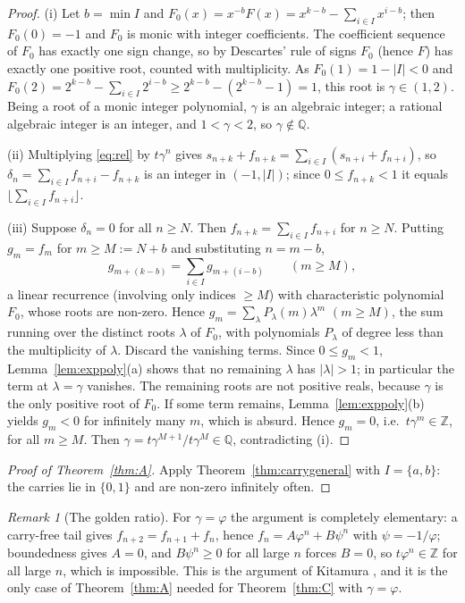 \documentclass[11pt]{amsart}
\theoremstyle{definition}
\theoremstyle{remark}
\newtheorem{remark}[lemma]{Remark}
\newcommand{\Z}{\mathbb{Z}}
\newcommand{\Q}{\mathbb{Q}}
\newcommand{\fl}[1]{\lfloor #1\rfloor}
\begin{document}
\begin{proof}
(i) Let $b=\min I$ and $F_0(x)=x^{-b}F(x)=x^{k-b}-\sum_{i\in I}x^{i-b}$; then $F_0(0)=-1$
and $F_0$ is monic with integer coefficients. The coefficient sequence of $F_0$ has exactly
one sign change, so by Descartes' rule of signs $F_0$ (hence $F$) has exactly one positive
root, counted with multiplicity. As $F_0(1)=1-|I|<0$ and
$F_0(2)=2^{k-b}-\sum_{i\in I}2^{i-b}\ge2^{k-b}-(2^{k-b}-1)=1$, this root is $\gamma\in(1,2)$.
Being a root of a monic integer polynomial, $\gamma$ is an algebraic integer; a rational
algebraic integer is an integer, and $1<\gamma<2$, so $\gamma\notin\Q$.

(ii) Multiplying \eqref{eq:rel} by $t\gamma^n$ gives
$s_{n+k}+f_{n+k}=\sum_{i\in I}(s_{n+i}+f_{n+i})$, so
$\delta_n=\sum_{i\in I}f_{n+i}-f_{n+k}$ is an integer in $(-1,|I|)$; since
$0\le f_{n+k}<1$ it equals $\fl{\sum_{i\in I}f_{n+i}}$.

(iii) Suppose $\delta_n=0$ for all $n\ge N$. Then $f_{n+k}=\sum_{i\in I}f_{n+i}$ for
$n\ge N$. Putting $g_m=f_m$ for $m\ge M:=N+b$ and substituting $n=m-b$,
\[
  g_{m+(k-b)}=\sum_{i\in I}g_{m+(i-b)}\qquad(m\ge M),
\]
a linear recurrence (involving only indices $\ge M$) with characteristic polynomial $F_0$,
whose roots are non-zero. Hence $g_m=\sum_{\lambda}P_\lambda(m)\lambda^m$ $(m\ge M)$, the sum
running over the distinct roots $\lambda$ of $F_0$, with polynomials $P_\lambda$ of degree less
than the multiplicity of $\lambda$. Discard the vanishing terms. Since $0\le g_m<1$,
Lemma~\ref{lem:exppoly}(a) shows that no remaining $\lambda$ has $|\lambda|>1$; in particular
the term at $\lambda=\gamma$ vanishes. The remaining roots are not positive reals, because
$\gamma$ is the only positive root of $F_0$. If some term remains,
Lemma~\ref{lem:exppoly}(b) yields $g_m<0$ for infinitely many $m$, which is absurd. Hence
$g_m=0$, i.e.\ $t\gamma^m\in\Z$, for all $m\ge M$. Then
$\gamma=t\gamma^{M+1}/t\gamma^M\in\Q$, contradicting (i).
\end{proof}

\begin{proof}[Proof of Theorem~\ref{thm:A}]
Apply Theorem~\ref{thm:carrygeneral} with $I=\{a,b\}$: the carries lie in $\{0,1\}$ and are
non-zero infinitely often.
\end{proof}

\begin{remark}[The golden ratio]\label{rem:phi}
For $\gamma=\varphi$ the argument is completely elementary: a carry-free tail gives
$f_{n+2}=f_{n+1}+f_n$, hence $f_n=A\varphi^n+B\psi^n$ with $\psi=-1/\varphi$; boundedness gives
$A=0$, and $B\psi^n\ge0$ for all large $n$ forces $B=0$, so $t\varphi^n\in\Z$ for all large $n$,
which is impossible. This is the argument of Kitamura \cite{Kit26}, and it is the only case of
Theorem~\ref{thm:A} needed for Theorem~\ref{thm:C} with $\gamma=\varphi$.
\end{remark}
\end{document}

